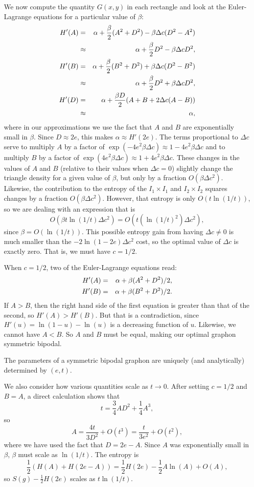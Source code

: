 \documentclass[12pt]{amsart}
\newcommand\be{\begin{equation}}
\newcommand\ee{\end{equation}}
\begin{document}
{We now compute the quantity $G(x,y)$ in each rectangle and look at the Euler-Lagrange equations for a particular value of $\beta$: 
\begin{eqnarray} 
H'(A) & = & \alpha + \frac{\beta}{2}(A^2 + D^2) - \beta \Delta c (D^2-A^2) \cr
& \approx & \alpha + \frac{\beta}{2} D^2 - \beta \Delta c D^2, \cr 
H'(B) & = & \alpha + \frac{\beta}{2}(B^2+D^2) + \beta \Delta c(D^2-B^2) \cr 
& \approx & \alpha + \frac{\beta}{2}D^2 + \beta \Delta c D^2, \cr 
H'(D) & = & \alpha + \frac{\beta D}{2} (A+B + 2 \Delta c (A-B)) \cr 
& \approx & \alpha, 
\end{eqnarray}
where in our approximations we use the fact that $A$ and $B$ are exponentially small in $\beta$. Since 
$D \approx 2e$, this makes $\alpha \approx H'(2e)$. The terms proportional to $\Delta c$ serve to 
multiply $A$ by a factor of $\exp(-4e^2\beta \Delta c) \approx 1 - 4e^2 \beta \Delta c$ and to multiply
$B$ by a factor of $\exp(4e^2 \beta \Delta c) \approx 1 + 4e^2 \beta \Delta c$. These changes in the values
of $A$ and $B$ (relative to their values when $\Delta c = 0$) slightly change the triangle density 
for a given value of $\beta$, but only by a fraction $O(\beta \Delta c^2)$. Likewise, the contribution 
to the entropy of the $I_1 \times I_1$ and $I_2 \times I_2$ squares changes by a fraction $O(\beta \Delta c^2)$. However, that entropy is only $O(t \ln(1/t))$, so we are dealing with an expression that is  
\be O(\beta t \ln(1/t) \Delta c^2) = O(t (\ln(1/t)^2) \Delta c^2), \ee
since $\beta = O(\ln(1/t))$. This possible entropy gain from having $\Delta c \ne 0$ is much smaller than
the $-2\ln(1-2e) \Delta c^2$ cost, so the optimal value of $\Delta c$ is exactly zero. That is, we 
must have $c=1/2$.  

When $c=1/2$, two of the Euler-Lagrange equations read: 
\begin{eqnarray}
H'(A) & = & \alpha + \beta(A^2 + D^2)/2, \cr 
H'(B) & = & \alpha + \beta(B^2 + D^2)/2.
\end{eqnarray} 
If $A>B$, then the right hand side of the first equation is greater than that of the second, so 
$H'(A) > H'(B)$. But that is a contradiction, since $H'(u) = \ln(1-u) - \ln(u) $ is a decreasing 
function of $u$. Likewise, we cannot have $A<B$. So $A$ and $B$ must be equal, making our optimal graphon 
symmetric bipodal. 

The parameters of a symmetric bipodal graphon are uniquely (and 
analytically) determined by $(e,t)$. 

We also consider how various quantities scale as $t \to 0$. After setting $c=1/2$ and 
$B=A$, a direct calculation shows that 
\be t = \frac{3}{4} AD^2 + \frac14 A^3, \ee
so 
\be A = \frac{4t}{3D^2} + O(t^3) = \frac{t}{3e^2} + O(t^2), \ee
where we have used the fact that $D=2e-A$. Since $A$ was exponentially small in $\beta$, $\beta$
must scale as $\ln(1/t)$. The entropy is 
\be \frac12 (H(A) + H(2e-A)) = \frac12 H(2e) -\frac12 A \ln(A) + O(A), \ee
so $S(g)-\frac12 H(2e)$ scales as $t \ln(1/t)$. 

}
\end{document}
